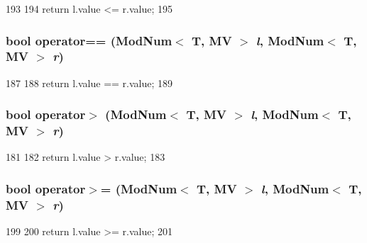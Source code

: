 \begin{DoxyCode}
193                                              {
194     return l.value <= r.value;
195 }
\end{DoxyCode}
\hypertarget{mod__num_8hh_ad75509a921857057cd6fbaf84c699b48}{
\subsubsection[{operator==}]{\setlength{\rightskip}{0pt plus 5cm}bool operator== ({\bf ModNum}$<$ T, MV $>$ {\em l}, \/  {\bf ModNum}$<$ T, MV $>$ {\em r})}}
\label{mod__num_8hh_ad75509a921857057cd6fbaf84c699b48}



\begin{DoxyCode}
187                                              {
188     return l.value == r.value;
189 }
\end{DoxyCode}
\hypertarget{mod__num_8hh_a5783f552d52471d44933cc6970fc5618}{
\subsubsection[{operator$>$}]{\setlength{\rightskip}{0pt plus 5cm}bool operator$>$ ({\bf ModNum}$<$ T, MV $>$ {\em l}, \/  {\bf ModNum}$<$ T, MV $>$ {\em r})}}
\label{mod__num_8hh_a5783f552d52471d44933cc6970fc5618}



\begin{DoxyCode}
181                                             {
182     return l.value > r.value;
183 }
\end{DoxyCode}
\hypertarget{mod__num_8hh_aaa8d528ed5d144f66b188d80feef0c09}{
\subsubsection[{operator$>$=}]{\setlength{\rightskip}{0pt plus 5cm}bool operator$>$= ({\bf ModNum}$<$ T, MV $>$ {\em l}, \/  {\bf ModNum}$<$ T, MV $>$ {\em r})}}
\label{mod__num_8hh_aaa8d528ed5d144f66b188d80feef0c09}



\begin{DoxyCode}
199                                              {
200     return l.value >= r.value;
201 }
\end{DoxyCode}
